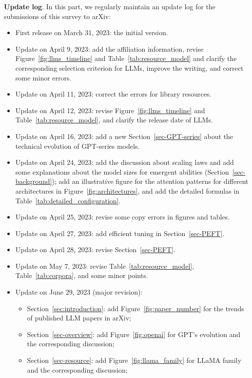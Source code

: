 {\textbf{Update log}. In this part, we regularly  maintain an update log for the submissions of this survey to arXiv:

\begin{itemize}
\item First release on March 31, 2023: the initial  version. 
\item Update on April 9, 2023: add the affiliation information, revise Figure~\ref{fig:llms_timeline} and Table~\ref{tab:resource_model} and clarify the corresponding selection criterion for LLMs, improve the writing,  and correct  some minor errors. 
\item Update on April 11, 2023: correct  the errors for library resources.  
\item Update on April 12, 2023: revise  Figure~\ref{fig:llms_timeline} and Table~\ref{tab:resource_model}, and clarify the release date of LLMs.
\item Update on April 16, 2023: add a new Section~\ref{sec-GPT-series} about the technical evolution of GPT-series models.
\item Update on April 24, 2023: add the discussion about scaling laws and add some explanations about the model sizes for emergent abilities (Section~\ref{sec-background}); add an illustrative figure for the attention patterns for different architectures in Figure~\ref{fig:architectures}, and add the detailed formulas in Table~\ref{tab:detailed_configuration}.
\item Update on April 25, 2023: revise some copy errors in figures and tables. 
\item Update on April 27, 2023: add efficient tuning in Section~\ref{sec-PEFT}.
\item Update on April 28, 2023: revise  Section~\ref{sec-PEFT}.
\item Update on May 7, 2023: revise Table~\ref{tab:resource_model}, Table~\ref{tab:corpora}, and some minor points.
\item {Update on June 29, 2023 (major revision): }
\begin{itemize}
\item Section~\ref{sec:introduction}: add Figure~\ref{fig:paper_number} for the trends of published LLM papers in arXiv;
\item  Section~\ref{sec-overview}: add  Figure~\ref{fig:openai} for GPT's evolution and the corresponding discussion;
\item  Section~\ref{sec-resource}: add Figure~\ref{fig:llama_family} for LLaMA family and the corresponding discussion;

\end{itemize}
\end{itemize}}
